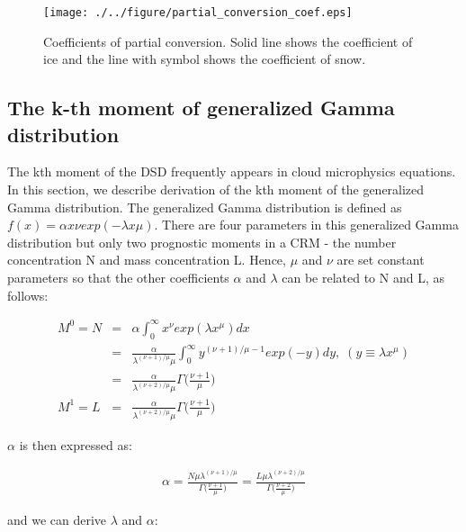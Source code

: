 \begin{figure}[htpb]
\begin{center}
\texttt{[image: ./../figure/partial\_conversion\_coef.eps]}
\end{center}
\caption{Coefficients of partial conversion. Solid line shows the coefficient of ice and the line with symbol shows the coefficient of snow.}
\label{figsn2-23}
\end{figure}

\subsection{The k-th moment of generalized Gamma distribution}
The kth moment of the DSD frequently appears in cloud microphysics equations. In this section, we describe derivation of the kth moment of the generalized Gamma distribution. The generalized Gamma distribution is defined as $f(x) = \alpha x \nu exp(-\lambda x \mu)$. There are four parameters in this generalized Gamma distribution but only two prognostic moments in a CRM - the number concentration N and mass concentration L. Hence, $\mu$ and $\nu$ are set constant parameters so that the other coefficients $\alpha$ and $\lambda$ can be related to N and L, as follows:

\begin{eqnarray}
M^{0}=N&=&\alpha\int_{0}^{\infty}x^{\nu}exp(\lambda x^{\mu})dx\nonumber\\
&=&\frac{\alpha}{\lambda^{(\nu+1)/\mu}\mu}\int_{0}^{\infty}y^{(\nu+1)/\mu-1}exp(-y)dy,\;(y\equiv\lambda x^{\mu})\nonumber\\
&=&\frac{\alpha}{\lambda^{(\nu+2)/\mu}\mu}\Gamma\bigl(\frac{\nu+1}{\mu}\bigr)\label{sn255}\\
M^{1}=L&=&\frac{\alpha}{\lambda^{(\nu+2)/\mu}\mu}\Gamma\bigl(\frac{\nu+1}{\mu}\bigr)\nonumber
\end{eqnarray}

$\alpha$ is then expressed as:

\begin{eqnarray}
\alpha=\frac{N\mu\lambda^{(\nu+1)/\mu}}{\Gamma\bigl(\frac{\nu+1}{\mu}\bigr)}=\frac{L\mu \lambda^{(\nu+2)/\mu}}{\Gamma\bigl(\frac{\nu+2}{\mu}\bigr)}\nonumber
\end{eqnarray}

and we can derive $\lambda$ and $\alpha$:

